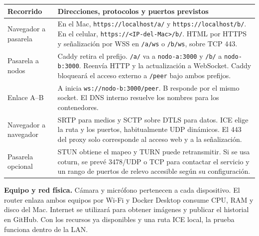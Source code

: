 \documentclass[11pt,letterpaper]{article}
\newcommand{\ct}[1]{\texttt{#1}}
\newcommand{\refn}[1]{\mbox{\hyperlink{fuente#1}{\sffamily\fontsize{8.8}{10}\selectfont [#1]}}}
\begin{document}
{\small\begin{tabularx}{\linewidth}{@{}L{.24\linewidth}Q@{}}\toprule
\textbf{Recorrido} & \textbf{Direcciones, protocolos y puertos previstos}\\\midrule
Navegador a pasarela & En el Mac, \ct{https://localhost/a/} y \ct{https://localhost/b/}. En el celular, \ct{https://<IP-del-Mac>/b/}. HTML por HTTPS y señalización por WSS en \ct{/a/ws} o \ct{/b/ws}, sobre TCP 443.\\
Pasarela a nodos & Caddy retira el prefijo. \ct{/a/} va a \ct{nodo-a:3000} y \ct{/b/} a \ct{nodo-b:3000}. Reenvía HTTP y la actualización a WebSocket. Caddy bloqueará el acceso externo a \ct{/peer} bajo ambos prefijos.\\
Enlace A–B & A inicia \ct{ws://nodo-b:3000/peer}. B responde por el mismo socket. El DNS interno resuelve los nombres para los contenedores.\\
Navegador a navegador & SRTP para medios y SCTP sobre DTLS para datos. ICE elige la ruta y los puertos, habitualmente UDP dinámicos. El 443 del proxy solo corresponde al acceso web y a la señalización.\\
Pasarela opcional & STUN obtiene el mapeo y TURN puede retransmitir. Si se usa coturn, se prevé 3478/UDP o TCP para contactar el servicio y un rango de puertos de relevo accesible según su configuración.\\\bottomrule
\end{tabularx}}

\textbf{Equipo y red física.} Cámara y micrófono pertenecen a cada dispositivo. El router enlaza ambos equipos por Wi-Fi y Docker Desktop consume CPU, RAM y disco del Mac. Internet se utilizará para obtener imágenes y publicar el historial en GitHub. Con los recursos ya disponibles y una ruta ICE local, la prueba funciona dentro de la LAN. \refn{1} \refn{2} \refn{3} \refn{7}
\end{document}
